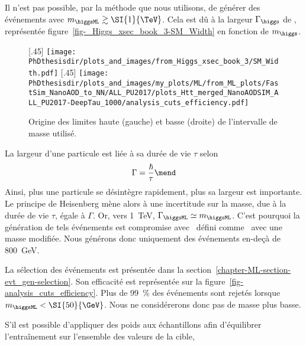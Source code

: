 \par
Il n'est pas possible, par la méthode que nous utilisons, de générer des événements avec $m_{\higgsML}\gtrsim\SI{1}{\TeV}$.
Cela est dû à la largeur $\Gamma_{\higgs}$ de \higgs, représentée figure~\ref{fig-_Higgs_xsec_book_3-SM_Width} en fonction de $m_{\higgs}$.
\begin{figure}[b]
\centering

[.45\textwidth]
{\texttt{[image: \\PhDthesisdir/plots\_and\_images/from\_Higgs\_xsec\_book\_3/SM\_Width.pdf]}}
\hfill
{}[.45\textwidth]
{\texttt{[image: \\PhDthesisdir/plots\_and\_images/my\_plots/ML/from\_ML\_plots/FastSim\_NanoAOD\_to\_NN/ALL\_PU2017/plots\_Htt\_merged\_NanoAODSIM\_ALL\_PU2017-DeepTau\_1000/analysis\_cuts\_efficiency.pdf]}}

\caption{Origine des limites haute (gauche) et basse (droite) de l'intervalle de masse utilisé.}
\end{figure}
La largeur d'une particule est liée à sa durée de vie $\tau$ selon
\begin{equation}
\Gamma = \frac{\hbar}{\tau}
\mend
\end{equation}
Ainsi, plus une particule se désintègre rapidement, plus sa largeur est importante.
Le principe de Heisenberg mène alors à une incertitude sur la masse, due à la durée de vie $\tau$, égale à $\Gamma$.
Or, vers \SI{1}{\TeV}, $\Gamma_{\higgsML}\simeq m_{\higgsML}$.
C'est pourquoi la génération de tels événements est compromise avec \higgsML\ défini comme \higgs\ avec une masse modifiée.
Nous générons donc uniquement des événements en-deçà de \SI{800}{\GeV}.
\par
La sélection des événements est présentée dans la section~\ref{chapter-ML-section-evt_gen-selection}.
Son efficacité est représentée sur la figure~\ref{fig-analysis_cuts_efficiency}.
Plus de \SI{99}{\%} des événements sont rejetés lorsque $m_{\higgsML} < \SI{50}{\GeV}$.
Nous ne considérerons donc pas de masse plus basse.
\par
S'il est possible d'appliquer des poids aux échantillons afin d'équilibrer l'entraînement sur l'ensemble des valeurs de la cible,
